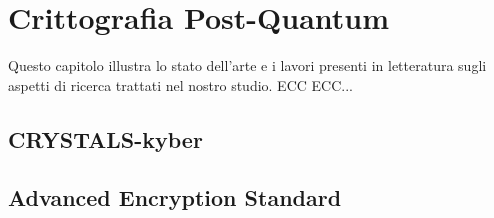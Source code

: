 \chapter{Crittografia Post-Quantum}

\begin{citazione}
    Questo capitolo illustra lo stato dell'arte e i lavori presenti in letteratura sugli aspetti di ricerca trattati nel nostro studio. ECC ECC...
    \end{citazione}

\section{CRYSTALS-kyber}

\section{Advanced Encryption Standard}

\newpage